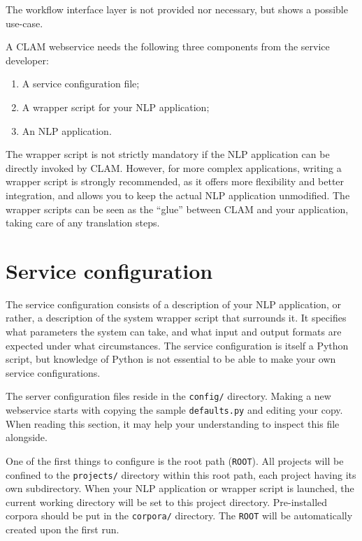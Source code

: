 \documentclass[a4paper,12pt]{report}
\begin{document}
The workflow interface layer is not provided nor necessary, but shows a possible use-case.

A CLAM webservice needs the following three components from the service developer:

\begin{enumerate}
\item A service configuration file;
\item A wrapper script for your NLP application;
\item An NLP application.
\end{enumerate}

The wrapper script is not strictly mandatory if the NLP application can be directly invoked by CLAM. However, for more complex applications, writing a wrapper script is strongly recommended, as it offers more flexibility and better integration, and allows you to keep the actual NLP application unmodified. The wrapper scripts can be seen as the ``glue'' between CLAM and your application, taking care of any translation steps.


\section{Service configuration}
\label{sec:serviceconfig}

The service configuration consists of a description of your NLP application, or rather, a description of the system wrapper script that surrounds it. It specifies what parameters the system can take, and what input and output formats are expected under what circumstances. The service configuration is itself a Python script, but knowledge of Python is not essential to be able to make your own service configurations. 

The server configuration files reside in the \texttt{config/} directory. Making a new webservice starts with copying the sample \texttt{defaults.py} and editing your copy. When reading this section, it may help your understanding to inspect this file alongside.

One of the first things to configure is the root path (\texttt{ROOT}). All projects will be confined to the \texttt{projects/} directory within this root path, each project having its own subdirectory. When your NLP application or wrapper script is launched, the current working directory will be set to this project directory. Pre-installed corpora should be put in the \texttt{corpora/} directory. The \texttt{ROOT} will be automatically created upon the first run.
\end{document}
